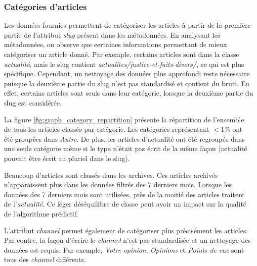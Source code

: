 \documentclass[french]{article}
\begin{document}


\subsubsection{Catégories d'articles} \label{category-section}
Les données fournies permettent de catégoriser les articles à partir de la première partie de l'attribut \emph{slug} présent dans les métadonnées. En analysant les métadonnées, on observe que certaines informations permettant de mieux catégoriser un article donné. Par exemple, certains articles sont dans la classe \emph{actualité}, mais le slug contient \emph{actualites/justice-et-faits-divers/}, ce qui est plus spécifique. Cependant, un nettoyage des données plus approfondi reste nécessaire puisque la deuxième partie du slug n'est pas standardisé et contient du bruit. En effet, certains articles sont seuls dans leur catégorie, lorsque la deuxième partie du slug est considérée.

La figure \ref{fig:graph_category_repartition} présente la répartition de l'ensemble de tous les articles classés par catégorie. Les catégories représentant $<1\%$ ont été groupées dans \emph{Autre}. De plus, les articles d'actualité ont été regroupés dans une seule catégorie même si le type n'était pas écrit de la même façon (actualité pouvait être écrit au pluriel dans le slug).

Beaucoup d'articles sont classés dans les archives. Ces articles archivés n'apparaissent plus dans les données filtrés des 7 derniers mois. Lorsque les données des 7 derniers mois sont utilisées, près de la moitié des articles traitent de l'\emph{actualité}. Ce léger déséquilibre de classe peut avoir un impact sur la qualité de l'algorithme prédictif.

L'attribut \emph{channel} permet également de catégoriser plus précisément les articles. Par contre, la façon d'écrire le \emph{channel} n'est pas standardisée et un nettoyage des données est requis. Par exemple, \emph{Votre opinion}, \emph{Opinions} et \emph{Points de vue} sont tous des \emph{channel} différents.
\end{document}

